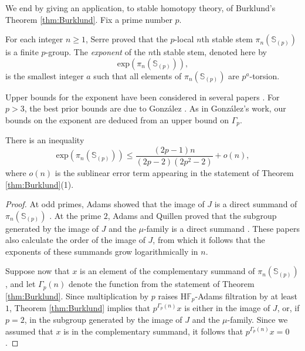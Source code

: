 
We end by giving an application, to stable homotopy theory, of Burklund's Theorem \ref{thm:Burklund}. Fix a prime number $p$.

\begin{dfn}
For each integer $n \ge 1$, Serre proved \cite{SerreFinite} that the $p$-local $n$th stable stem 
$\pi_n(\mathbb{S}_{(p)})$
is a finite $p$-group.  The \emph{exponent} of the $n$th stable stem, denoted here by
$$\mathrm{exp}(\pi_n(\mathbb{S}_{(p)})),$$
is the smallest integer $a$ such that all elements of $\pi_n(\mathbb{S}_{(p)})$ are $p^a$-torsion. 
\end{dfn}

Upper bounds for the exponent have been considered in several papers \cite{Ad:SHT, liul, Arlettaz, Gonz00, MathewExponent}.  For $p>3$, the best prior bounds are due to Gonz\'alez \cite[Corollary 4.1.4]{Gonz00}. As in Gonz\'alez's work, our bounds on the exponent are deduced from an upper bound on $\Gamma_p$.

\begin{thm}[Burklund] \label{thm:torsion-bound}
There is an inequality
$$\mathrm{exp}(\pi_n(\mathbb{S}_{(p)})) \le \frac{(2p-1)n}{(2p-2)(2p^2-2)} + o(n),$$
where $o(n)$ is the sublinear error term appearing in the statement of Theorem \ref{thm:Burklund}(1).
\end{thm}

\begin{proof}
At odd primes, Adams showed that the image of $J$ is a direct summand of $\pi_n(\mathbb{S}_{(p)})$ \cite{Ad:SHT, AdamsJIV}.  At the prime $2$, Adams and Quillen proved that the subgroup generated by the image of $J$ and the $\mu$-family is a direct summand \cite{QuillenAdamsConj}.  These papers also calculate the order of the image of $J$, from which it follows that the exponents of these summands grow logarithmically in $n$.

Suppose now that $x$ is an element of the complementary summand of $\pi_n(\mathbb{S}_{(p)})$, and let $\Gamma_p(n)$ denote the function from the statement of Theorem \ref{thm:Burklund}.  Since multiplication by $p$ raises $\mathrm{H}\mathbb{F}_p$-Adams filtration by at least $1$, Theorem \ref{thm:Burklund} implies that $p^{\Gamma_p(n)}x$ is either in the image of $J$, or, if $p=2$, in the subgroup generated by the image of $J$ and the $\mu$-family.  Since we assumed that $x$ is in the complementary summand, it follows that $p^{\Gamma_p(n)}x=0$.
\end{proof}

